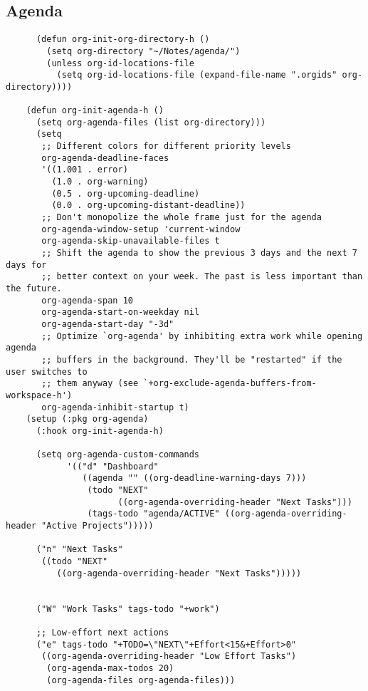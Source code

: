 \documentclass[11pt]{article}
\begin{document}
\subsection{Agenda}
\label{sec:org8e8a6d0}
\begin{verbatim}
      (defun org-init-org-directory-h ()
        (setq org-directory "~/Notes/agenda/")
        (unless org-id-locations-file
          (setq org-id-locations-file (expand-file-name ".orgids" org-directory))))

    (defun org-init-agenda-h ()
      (setq org-agenda-files (list org-directory)))
      (setq
       ;; Different colors for different priority levels
       org-agenda-deadline-faces
       '((1.001 . error)
         (1.0 . org-warning)
         (0.5 . org-upcoming-deadline)
         (0.0 . org-upcoming-distant-deadline))
       ;; Don't monopolize the whole frame just for the agenda
       org-agenda-window-setup 'current-window
       org-agenda-skip-unavailable-files t
       ;; Shift the agenda to show the previous 3 days and the next 7 days for
       ;; better context on your week. The past is less important than the future.
       org-agenda-span 10
       org-agenda-start-on-weekday nil
       org-agenda-start-day "-3d"
       ;; Optimize `org-agenda' by inhibiting extra work while opening agenda
       ;; buffers in the background. They'll be "restarted" if the user switches to
       ;; them anyway (see `+org-exclude-agenda-buffers-from-workspace-h')
       org-agenda-inhibit-startup t)
    (setup (:pkg org-agenda)
      (:hook org-init-agenda-h)

      (setq org-agenda-custom-commands
            '(("d" "Dashboard"
               ((agenda "" ((org-deadline-warning-days 7)))
                (todo "NEXT"
                      ((org-agenda-overriding-header "Next Tasks")))
                (tags-todo "agenda/ACTIVE" ((org-agenda-overriding-header "Active Projects")))))

      ("n" "Next Tasks"
       ((todo "NEXT"
          ((org-agenda-overriding-header "Next Tasks")))))


      ("W" "Work Tasks" tags-todo "+work")

      ;; Low-effort next actions
      ("e" tags-todo "+TODO=\"NEXT\"+Effort<15&+Effort>0"
       ((org-agenda-overriding-header "Low Effort Tasks")
        (org-agenda-max-todos 20)
        (org-agenda-files org-agenda-files)))


\end{verbatim}
\end{document}
